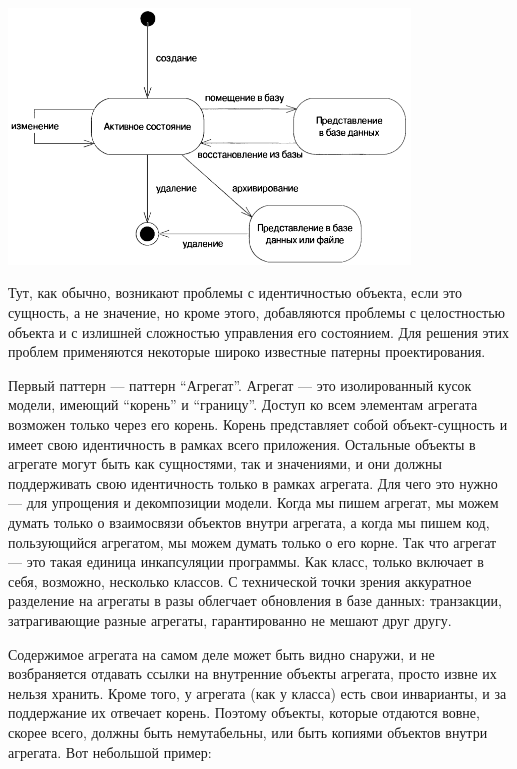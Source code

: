 \documentclass[a5paper]{article}
\begin{document}
\begin{center}
    \includegraphics[width=0.8\textwidth]{objectLifeCycle.png}
\end{center}

Тут, как обычно, возникают проблемы с идентичностью объекта, если это сущность, а не значение, но кроме этого, добавляются проблемы с целостностью объекта и с излишней сложностью управления его состоянием. Для решения этих проблем применяются некоторые широко известные патерны проектирования.

Первый паттерн --- паттерн ``Агрегат''. Агрегат --- это изолированный кусок модели, имеющий ``корень'' и ``границу''. Доступ ко всем элементам агрегата возможен только через его корень. Корень представляет собой объект-сущность и имеет свою идентичность в рамках всего приложения. Остальные объекты в агрегате могут быть как сущностями, так и значениями, и они должны поддерживать свою идентичность только в рамках агрегата. Для чего это нужно --- для упрощения и декомпозиции модели. Когда мы пишем агрегат, мы можем думать только о взаимосвязи объектов внутри агрегата, а когда мы пишем код, пользующийся агрегатом, мы можем думать только о его корне. Так что агрегат --- это такая единица инкапсуляции программы. Как класс, только включает в себя, возможно, несколько классов. С технической точки зрения аккуратное разделение на агрегаты в разы облегчает обновления в базе данных: транзакции, затрагивающие разные агрегаты, гарантированно не мешают друг другу.

Содержимое агрегата на самом деле может быть видно снаружи, и не возбраняется отдавать ссылки на внутренние объекты агрегата, просто извне их нельзя хранить. Кроме того, у агрегата (как у класса) есть свои инварианты, и за поддержание их отвечает корень. Поэтому объекты, которые отдаются вовне, скорее всего, должны быть немутабельны, или быть копиями объектов внутри агрегата. Вот небольшой пример:
\end{document}
